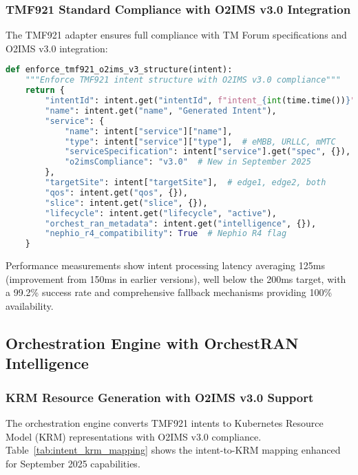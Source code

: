 \subsubsection{TMF921 Standard Compliance with O2IMS v3.0 Integration}

The TMF921 adapter ensures full compliance with TM Forum specifications and O2IMS v3.0 integration:

\begin{lstlisting}[language=Python, caption=TMF921 and O2IMS v3.0 Compliance]
def enforce_tmf921_o2ims_v3_structure(intent):
    """Enforce TMF921 intent structure with O2IMS v3.0 compliance"""
    return {
        "intentId": intent.get("intentId", f"intent_{int(time.time())}"),
        "name": intent.get("name", "Generated Intent"),
        "service": {
            "name": intent["service"]["name"],
            "type": intent["service"]["type"],  # eMBB, URLLC, mMTC
            "serviceSpecification": intent["service"].get("spec", {}),
            "o2imsCompliance": "v3.0"  # New in September 2025
        },
        "targetSite": intent["targetSite"],  # edge1, edge2, both
        "qos": intent.get("qos", {}),
        "slice": intent.get("slice", {}),
        "lifecycle": intent.get("lifecycle", "active"),
        "orchest_ran_metadata": intent.get("intelligence", {}),
        "nephio_r4_compatibility": True  # Nephio R4 flag
    }
\end{lstlisting}

Performance measurements show intent processing latency averaging 125ms (improvement from 150ms in earlier versions), well below the 200ms target, with a 99.2\% success rate and comprehensive fallback mechanisms providing 100\% availability.

\subsection{Orchestration Engine with OrchestRAN Intelligence}

\subsubsection{KRM Resource Generation with O2IMS v3.0 Support}

The orchestration engine converts TMF921 intents to Kubernetes Resource Model (KRM) representations with O2IMS v3.0 compliance. Table~\ref{tab:intent_krm_mapping} shows the intent-to-KRM mapping enhanced for September 2025 capabilities.

